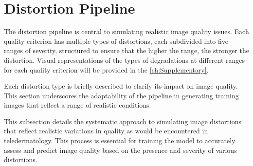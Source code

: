 \section{Distortion Pipeline}
\label{sec:DistPipeline}
The distortion pipeline is central to simulating realistic image quality issues. Each quality criterion has multiple types of distortions, each subdivided into five ranges of severity, structured to ensure that the higher the range, the stronger the distortion. Visual representations of the types of degradations at different ranges for each quality criterion will be provided in the \autoref{ch:Supplementary}.  \par
Each distortion type is briefly described to clarify its impact on image quality. This section underscores the adaptability of the pipeline in generating training images that reflect a range of realistic conditions. \par
\vspace{\baselineskip}
\noindent
This subsection details the systematic approach to simulating image distortions that reflect realistic variations in quality as would be encountered in teledermatology. This process is essential for training the model to accurately assess and predict image quality based on the presence and severity of various distortions.\par
\vspace{\baselineskip}
\noindent

